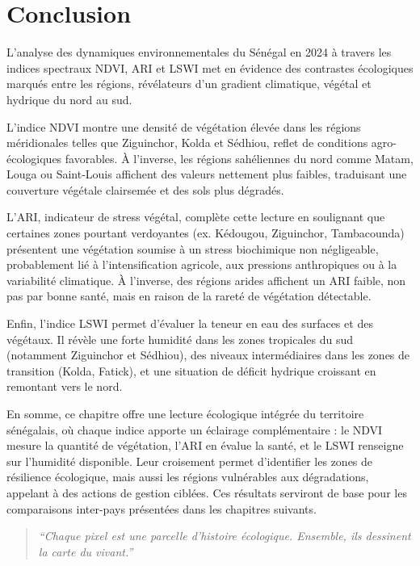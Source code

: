 \documentclass[
]{book}
\begin{document}
\section{Conclusion}\label{conclusion}

L'analyse des dynamiques environnementales du Sénégal en 2024 à travers les indices spectraux NDVI, ARI et LSWI met en évidence des contrastes écologiques marqués entre les régions, révélateurs d'un gradient climatique, végétal et hydrique du nord au sud.

L'indice NDVI montre une densité de végétation élevée dans les régions méridionales telles que Ziguinchor, Kolda et Sédhiou, reflet de conditions agro-écologiques favorables. À l'inverse, les régions sahéliennes du nord comme Matam, Louga ou Saint-Louis affichent des valeurs nettement plus faibles, traduisant une couverture végétale clairsemée et des sols plus dégradés.

L'ARI, indicateur de stress végétal, complète cette lecture en soulignant que certaines zones pourtant verdoyantes (ex. Kédougou, Ziguinchor, Tambacounda) présentent une végétation soumise à un stress biochimique non négligeable, probablement lié à l'intensification agricole, aux pressions anthropiques ou à la variabilité climatique. À l'inverse, des régions arides affichent un ARI faible, non pas par bonne santé, mais en raison de la rareté de végétation détectable.

Enfin, l'indice LSWI permet d'évaluer la teneur en eau des surfaces et des végétaux. Il révèle une forte humidité dans les zones tropicales du sud (notamment Ziguinchor et Sédhiou), des niveaux intermédiaires dans les zones de transition (Kolda, Fatick), et une situation de déficit hydrique croissant en remontant vers le nord.

En somme, ce chapitre offre une lecture écologique intégrée du territoire sénégalais, où chaque indice apporte un éclairage complémentaire : le NDVI mesure la quantité de végétation, l'ARI en évalue la santé, et le LSWI renseigne sur l'humidité disponible. Leur croisement permet d'identifier les zones de résilience écologique, mais aussi les régions vulnérables aux dégradations, appelant à des actions de gestion ciblées. Ces résultats serviront de base pour les comparaisons inter-pays présentées dans les chapitres suivants.

\begin{quote}
\emph{``Chaque pixel est une parcelle d'histoire écologique. Ensemble, ils dessinent la carte du vivant.''}
\end{quote}
\end{document}

